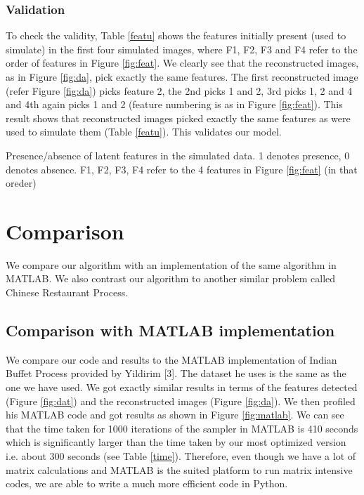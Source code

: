 \documentclass[11pt]{article}
\begin{document}
\subsubsection{Validation}
To check the validity, Table \ref{featu} shows the features initially present (used to simulate) in the first four simulated images, where F1, F2, F3 and F4 refer to the order of features in Figure \ref{fig:feat}. We clearly see that the reconstructed images, as in Figure \ref{fig:da}, pick exactly the same features. The first reconstructed image (refer Figure \ref{fig:da}) picks feature 2, the 2nd picks 1 and 2, 3rd picks 1, 2 and 4 and 4th again picks 1 and 2 (feature numbering is as in Figure \ref{fig:feat}). This result shows that reconstructed images picked exactly the same features as were used to simulate them (Table \ref{featu}). This validates our model. 

\begin{table}[ht]
\centering
\caption{Presence/absence of latent features in the simulated data. 1 denotes presence, 0 denotes absence. F1, F2, F3, F4 refer to the 4 features in Figure \ref{fig:feat} (in that oreder) \label{featu}}

\end{table}

\section{Comparison}
We compare our algorithm with an implementation of the same algorithm in MATLAB. We also contrast our algorithm to another similar problem called Chinese Restaurant Process.

\subsection{Comparison with MATLAB implementation}
We compare our code and results to the MATLAB implementation of Indian Buffet Process provided by Yildirim [3]. The dataset he uses is the same as the one we have used. We got exactly similar results in terms of the features detected (Figure \ref{fig:dat}) and the reconstructed images (Figure \ref{fig:da}). We then profiled his MATLAB code and got results as shown in Figure \ref{fig:matlab}. We can see that the time taken for 1000 iterations of the sampler in MATLAB is 410 seconds which is significantly larger than the time taken by our most optimized version i.e. about 300 seconds (see Table \ref{time}). Therefore, even though we have a lot of matrix calculations and MATLAB is the suited platform to run matrix intensive codes, we are able to write a much more efficient code in Python.
\end{document}
